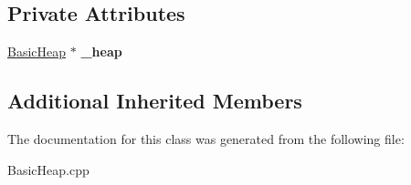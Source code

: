 \subsection*{Private Attributes}
\begin{DoxyCompactItemize}
\item 
\mbox{\label{class_internal_1_1_free_space_aa88e61b5d518682778c5c72764cad7b4}} 
\hyperlink{class_basic_heap}{Basic\+Heap} $\ast$ {\bfseries \+\_\+heap}
\end{DoxyCompactItemize}
\subsection*{Additional Inherited Members}


The documentation for this class was generated from the following file\+:\begin{DoxyCompactItemize}
\item 
Basic\+Heap.\+cpp\end{DoxyCompactItemize}
